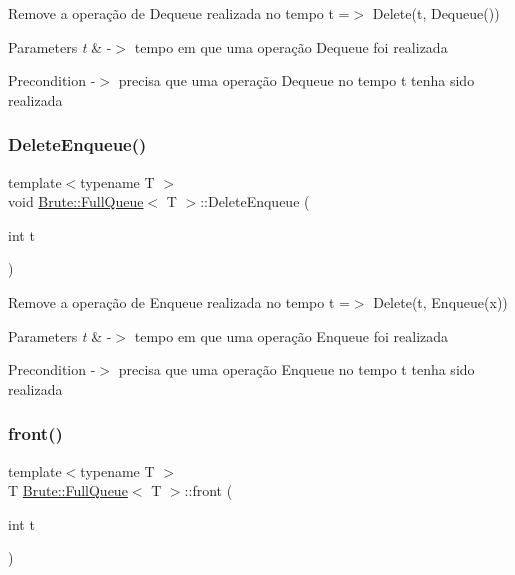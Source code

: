 Remove a operação de Dequeue realizada no tempo t =$>$ Delete(t, Dequeue())


\begin{DoxyParams}{Parameters}
{\em t} & -\/$>$ tempo em que uma operação Dequeue foi realizada \\
\hline
\end{DoxyParams}
\begin{DoxyPrecond}{Precondition}
-\/$>$ precisa que uma operação Dequeue no tempo t tenha sido realizada 
\end{DoxyPrecond}
\mbox{\label{classBrute_1_1FullQueue_a4bcd30eecb8f5120ddb680473890474b}} 
\subsubsection{\texorpdfstring{Delete\+Enqueue()}{DeleteEnqueue()}}
{\footnotesize\ttfamily template$<$typename T $>$ \\
void \hyperlink{classBrute_1_1FullQueue}{Brute\+::\+Full\+Queue}$<$ T $>$\+::Delete\+Enqueue (\begin{DoxyParamCaption}\item[{int}]{t }\end{DoxyParamCaption})}

Remove a operação de Enqueue realizada no tempo t =$>$ Delete(t, Enqueue(x))


\begin{DoxyParams}{Parameters}
{\em t} & -\/$>$ tempo em que uma operação Enqueue foi realizada \\
\hline
\end{DoxyParams}
\begin{DoxyPrecond}{Precondition}
-\/$>$ precisa que uma operação Enqueue no tempo t tenha sido realizada 
\end{DoxyPrecond}
\mbox{\label{classBrute_1_1FullQueue_a36660da3e77471d20bb6db71537a01f1}} 
\subsubsection{\texorpdfstring{front()}{front()}}
{\footnotesize\ttfamily template$<$typename T $>$ \\
T \hyperlink{classBrute_1_1FullQueue}{Brute\+::\+Full\+Queue}$<$ T $>$\+::front (\begin{DoxyParamCaption}\item[{int}]{t }\end{DoxyParamCaption})}

